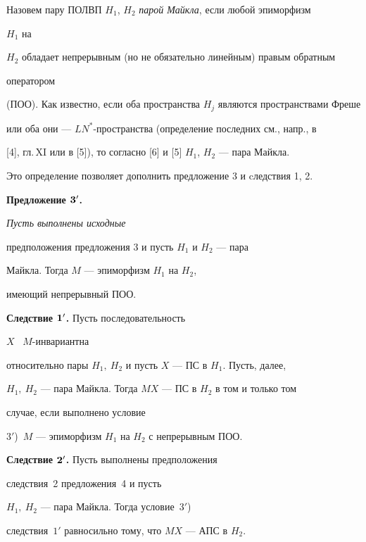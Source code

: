 Назовем пару ПОЛВП $H_1$, $H_2$ {\it парой Майкла}, если любой эпиморфизм


$H_1$ на


$H_2$ обладает непрерывным (но не обязательно линейным) правым обратным


оператором


(ПОО). Как известно, если оба пространства $H_j$ являются пространствами Фреше


или оба они --- $LN^*$-пространства (определение последних см., напр., в


[4], гл.\,XI или в [5]), то согласно [6] и [5] $H_1$, $H_2$ --- пара Майкла.


Это определение позволяет дополнить предложение 3 и cледствия 1, 2.


\medskip








{\bf Предложение $\bold 3'$.} {\it Пусть выполнены исходные


предположения предложения $3$ и пусть $H_1$ и $H_2$ --- пара 


Майкла. Тогда $M$ --- эпиморфизм $H_1$ на $H_2$,


имеющий непрерывный ПОО.}


\medskip








{\bf Следствие $\bold 1'$.} Пусть последовательность


$X$ \ $M$-инвариантна


относительно пары $H_1,\ H_2$ и пусть $X$ --- ПС в $H_1$. Пусть, далее,


$H_1,\ H_2$ --- пара Майкла. Тогда $MX$ --- ПС в $H_2$ в том и только том


случае, если выполнено условие


$3'$)~$M$ --- эпиморфизм $H_1$ на $H_2$ с непрерывным ПОО.


\medskip








{\bf Следствие $\bold 2'$.} Пусть выполнены предположения


следствия~2 предложения~4 и пусть


$H_1,\ H_2$ --- пара Майкла. Тогда условие~$3'$)


следствия~$1'$ равносильно тому, что $MX$ --- АПС в $H_2$.


